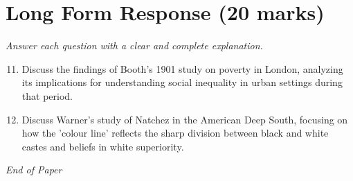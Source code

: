 \documentclass[12pt]{article}
\begin{document}
\section*{Long Form Response (20 marks)}
\textit{Answer each question with a clear and complete explanation.}
\begin{enumerate}[label=\arabic*.]
\setcounter{enumi}{10}
\item Discuss the findings of Booth's 1901 study on poverty in London, analyzing its implications for understanding social inequality in urban settings during that period.
\item Discuss Warner's study of Natchez in the American Deep South, focusing on how the 'colour line' reflects the sharp division between black and white castes and beliefs in white superiority.
\end{enumerate}

\vfill
\noindent\textit{End of Paper}
\end{document}
